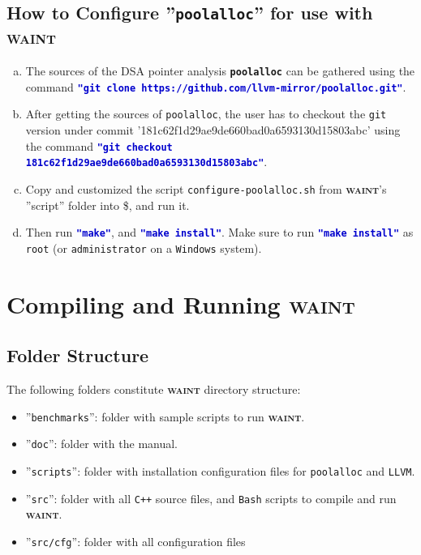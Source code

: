 \documentclass[12pt,onecolumn,a4paper]{article}
\newcommand{\waint}{\textsc{\textbf{waint}}\xspace}
\newcommand{\softwarenov}[1]{\texttt{\textbf{#1}}\xspace}
\newcommand{\tool}[1]{\texttt{#1}\xspace}
\newcommand{\command}[1]{\textcolor{mediumblue}{\texttt{\textbf{"#1"}}}\xspace}
\newcommand{\script}[1]{\texttt{#1}\xspace}
\newcommand{\envout}[1]{\textcolor{firebrickred}{\$\text{#1}}\xspace}
\begin{document}
\subsection{How to Configure ''\tool{poolalloc}'' for use with \textsc{waint}}
\begin{enumerate}[a)]
	\item The sources of the DSA pointer analysis \softwarenov{poolalloc}
	can be gathered using the command 
	\command{git clone https://github.com/llvm-mirror/poolalloc.git}.

	\item After getting the sources of \tool{poolalloc}, the user
	has to checkout the \tool{git} version under commit
	'181c62f1d29ae9de660bad0a6593130d15803abc' using the command
	\command{git checkout 181c62f1d29ae9de660bad0a6593130d15803abc}.

	\item Copy and customized the script \script{configure-poolalloc.sh}
	from \waint's ''script'' folder into \envout{POOLALLOC}, and
	run it.
	
	\item Then run \command{make}, and \command{make install}. Make sure
	to run \command{make install} as \texttt{root} (or \texttt{administrator}
	on a \texttt{Windows} system).
\end{enumerate}

\section{Compiling and Running \textsc{waint}}

\subsection{Folder Structure}
The following folders constitute \waint directory structure:
\begin{itemize}
	\item ''\texttt{benchmarks}'': folder with sample
	scripts to run \waint.

	\item ''\texttt{doc}'': folder with the manual.

	\item ''\texttt{scripts}'': folder with installation
	configuration files for \tool{poolalloc} and \tool{LLVM}.
	
	\item ''\texttt{src}'': folder with all \texttt{C++} source files,
	and \tool{Bash} scripts to compile and run \waint.

	\item ''\texttt{src/cfg}'': folder with all configuration files			
\end{itemize}
\end{document}
